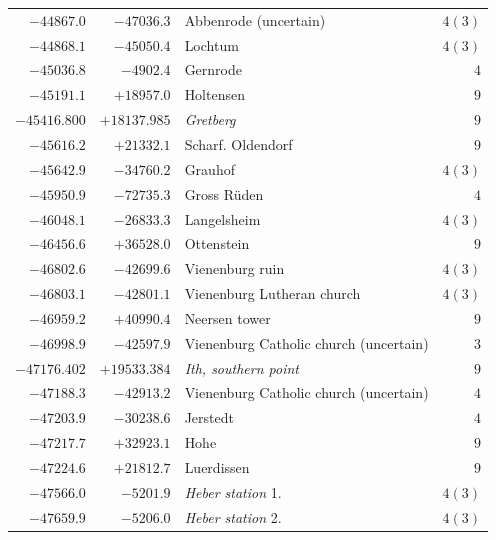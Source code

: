 \begin{center}
\begin{tabular}{r|r|p{170pt}|r}
\(-44867.0\)&\(-47036.3\)&Abbenrode (uncertain)&\(4 (3)\)\\
\(-44868.1\)&\(-45050.4\)&Lochtum&\(4 (3)\)\\
\(-45036.8\)&\(-4902.4\)&Gernrode&\(4\)\\
\(-45191.1\)&\(+18957.0\)&Holtensen&\(9\)\\
\(-45416.800\)&\(+18137.985\)&\textit{Gretberg}&\(9\)\\
\(-45616.2\)&\(+21332.1\)&Scharf. Oldendorf&\(9\)\\
\(-45642.9\)&\(-34760.2\)&Grauhof&\(4 (3)\)\\
\(-45950.9\)&\(-72735.3\)&Gross Rüden&\(4\)\\
\(-46048.1\)&\(-26833.3\)&Langelsheim&\(4 (3)\)\\
\(-46456.6\)&\(+36528.0\)&Ottenstein&\(9\)\\
\(-46802.6\)&\(-42699.6\)&Vienenburg ruin&\(4 (3)\)\\
\(-46803.1\)&\(-42801.1\)&Vienenburg Lutheran church&\(4 (3)\)\\
\(-46959.2\)&\(+40990.4\)&Neersen tower&\(9\)\\
\(-46998.9\)&\(-42597.9\)&Vienenburg Catholic church (uncertain)&\(3\)\\
\(-47176.402\)&\(+19533.384\)&\textit{Ith, southern point}&\(9\)\\
\(-47188.3\)&\(-42913.2\)&Vienenburg Catholic church (uncertain)&\(4\)\\
\(-47203.9\)&\(-30238.6\)&Jerstedt&\(4\)\\
\(-47217.7\)&\(+32923.1\)&Hohe&\(9\)\\
\(-47224.6\)&\(+21812.7\)&Luerdissen&\(9\)\\
\(-47566.0\)&\(-5201.9\)&\textit{Heber station} 1.&\(4 (3)\)\\
\(-47659.9\)&\(-5206.0\)&\textit{Heber station} 2.&\(4 (3)\)\\
\hline\end{tabular}\endgroup\end{center}
